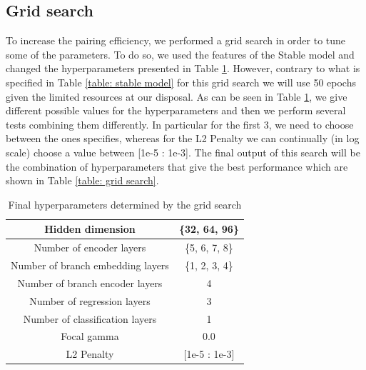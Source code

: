 \subsection{Grid search}
To increase the pairing efficiency, we performed a grid search in order to tune some of the parameters. 
To do so, we used the features of the Stable model and changed the hyperparameters presented in Table \ref{table: parameters for the grid search}. 
However, contrary to what is specified in Table \ref{table: stable model} for this grid search we will use 50 epochs given the limited resources at our disposal.
As can be seen in Table \ref{table: parameters for the grid search}, we give different possible values for the hyperparameters and then we perform several tests combining them differently.
In particular for the first 3, we need to choose between the ones specifies, whereas for the L2 Penalty we can continually (in log scale) choose a value between [1e-5 : 1e-3].
The final output of this search will be the combination of hyperparameters that give the best performance which are shown in Table \ref{table: grid search}.


\begin{table}[hbt]
   \centering
   \begin{tabular}{|c|c|}
    \hline
    Hidden dimension  &  \{32, 64, 96\}  \\
    \hline
   Number of encoder layers & \{5, 6, 7, 8\} \\
    \hline
    Number of branch embedding layers &  \{1, 2, 3, 4\}\\
    \hline
     Number of branch encoder layers & 4\\
    \hline
    Number of regression layers & 3 \\
    \hline
    Number of classification layers & 1 \\
    \hline
    Focal gamma & 0.0 \\
    \hline
    L2 Penalty & [1e-5 : 1e-3] \\
    \hline
   \end{tabular}
   \caption{Final hyperparameters determined by the grid search}
   \label{table: parameters for the grid search}
   \end{table}



